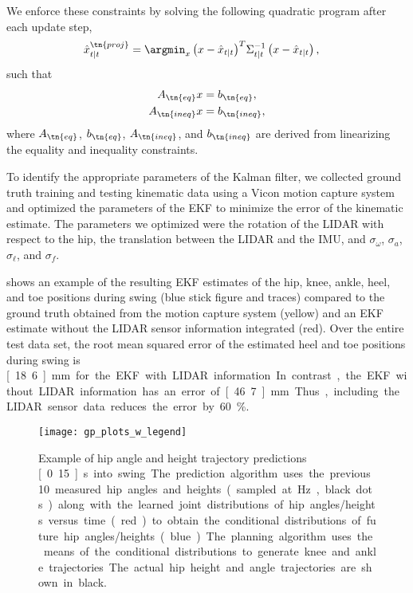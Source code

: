 \noindent We enforce these constraints by solving the following quadratic
program after each update step,
\begin{align}
\hat{x}_{t|t}^\tn{proj} 
    &= {\argmin_x \left(x - \hat{x}_{t|t} \right)}^T \Sigma_{t|t}^{-1} 
        \left(x - \hat{x}_{t|t} \right),
\end{align}
such that
\begin{align}
    A_\tn{eq} x &= b_\tn{eq}, \\
    A_\tn{ineq} x &= b_\tn{ineq},
\end{align}
where $A_\tn{eq}$,  $b_\tn{eq}$, $A_\tn{ineq}$, and $b_\tn{ineq}$ are derived
from linearizing the equality and inequality constraints.

To identify the appropriate parameters of the Kalman filter, we collected ground
truth training and testing kinematic data using a Vicon motion capture system
and optimized the parameters of the EKF to minimize the error of the kinematic
estimate. The parameters we optimized were the rotation of the LIDAR with
respect to the hip, the translation between the LIDAR and the IMU, and
$\sigma_\omega$, $\sigma_a$, $\sigma_\ell$, and $\sigma_f$. 

 shows an example of the resulting EKF estimates of the hip, knee,
ankle, heel, and toe positions during swing (blue stick figure and traces)
compared to the ground truth obtained from the motion capture system (yellow)
and an EKF estimate without the LIDAR sensor information integrated (red). Over
the entire test data set, the root mean squared error of the estimated heel and
toe positions during swing is \unit[18.6]{mm} for the EKF with LIDAR
information. In contrast, the EKF without LIDAR information has an error of
\unit[46.7]{mm}. Thus, including the LIDAR sensor data reduces the error by
60\%.

\begin{figure}[t]
    \centering
    \texttt{[image: gp\_plots\_w\_legend]}
    \caption{Example of hip angle and height trajectory predictions
    \unit[0.15]{s} into swing. The prediction algorithm uses the previous 10
    measured hip angles and heights (sampled at \unit[100]{Hz}, black dots)
    along with the learned joint distributions of hip angles/heights versus time
    (red) to obtain the conditional distributions of future hip angles/heights
    (blue). The planning algorithm uses the means of the conditional
    distributions to generate knee and ankle trajectories. The actual hip height
    and angle trajectories are shown in black.}
    \label{fig:gp_plots}
\end{figure}
